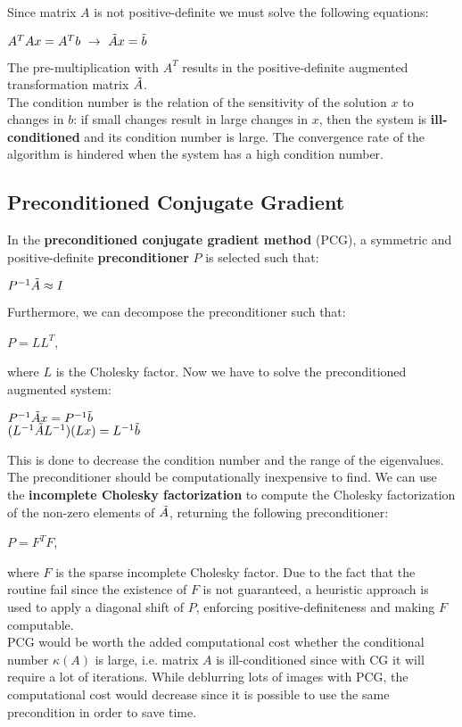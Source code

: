 \documentclass{article}
\begin{document}
\vspace{0.2cm}
Since matrix $A$ is not positive-definite we must solve the following equations:
\begin{center}
    $A^TAx = A^Tb \ \rightarrow \ \Tilde{A}x = \Tilde{b}$
\end{center}
The pre-multiplication with $A^T$ results in the positive-definite augmented transformation matrix $\Tilde{A}$. \\
The condition number is the relation of the sensitivity of the solution $x$ to changes in $b$: if small changes result in large changes in $x$, then the system is \textbf{ill-conditioned} and its condition number is large. The convergence rate of the algorithm is hindered when the system has a high condition number.
\subsection{Preconditioned Conjugate Gradient}
In the \textbf{preconditioned conjugate gradient method} (PCG), a symmetric and positive-definite \textbf{preconditioner} $P$ is selected such that:
\begin{center}
    $P^{-1} \Tilde{A} \approx I$
\end{center}
Furthermore, we can decompose the preconditioner such that:
\begin{center}
    $P = LL^T$,
\end{center}
where $L$ is the Cholesky factor.
\newpage
Now we have to solve the preconditioned augmented system:
\begin{center}
    $P^{-1}\Tilde{A}x = P^{-1}\Tilde{b}$ \\
    \vspace{0.25cm}
    $(L^{-1}\Tilde{A}L^{-1})(Lx) = L^{-1}\Tilde{b}$
\end{center}
This is done to decrease the condition number and the range of the eigenvalues. The preconditioner should be computationally inexpensive to find.
We can use the \textbf{incomplete Cholesky factorization} to compute the Cholesky factorization of the non-zero elements of $\Tilde{A}$, returning the following preconditioner: 
\begin{center}
    $P = F^TF$,
\end{center}
where $F$ is the sparse incomplete Cholesky factor. Due to the fact that the routine fail since the existence of $F$ is not guaranteed, a heuristic approach is used to apply a diagonal shift of $P$, enforcing positive-definiteness and making $F$ computable. \\
PCG would be worth the added computational cost whether the conditional number $\kappa(A)$ is large, i.e. matrix $A$ is ill-conditioned since with CG it will require a lot of iterations. While deblurring lots of images with PCG, the computational cost would decrease since it is possible to use the same precondition in order to save time.
\end{document}
